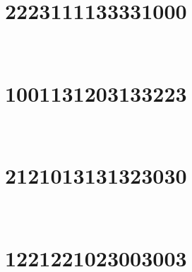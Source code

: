 \marginnote[3\baselineskip]{\centering}



\,
\newline
\vspace{1.2cm}

\section{2223111133331000}

\marginnote[3\baselineskip]{\centering}



\,
\newline
\vspace{1.2cm}

\section{1001131203133223}

\marginnote[3\baselineskip]{\centering}



\,
\newline
\vspace{1.2cm}

\section{2121013131323030}

\marginnote[3\baselineskip]{\centering}



\,
\newline
\vspace{1.2cm}

\section{1221221023003003}

\marginnote[3\baselineskip]{\centering}



\,
\newline
\vspace{1.2cm}
